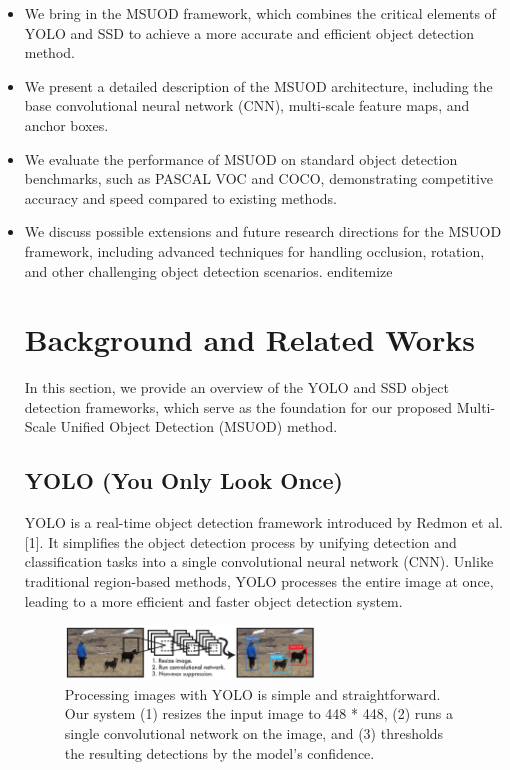 \documentclass[conference]{IEEEtran}
\begin{document}
\begin{itemize}
	
\item We bring in the MSUOD framework, which combines the critical elements of YOLO and SSD to achieve a more accurate and efficient object detection method.
\item We present a detailed description of the MSUOD architecture, including the base convolutional neural network (CNN), multi-scale feature maps, and anchor boxes.
\item We evaluate the performance of MSUOD on standard object detection benchmarks, such as PASCAL VOC and COCO, demonstrating competitive accuracy and speed compared to existing methods.
\item We discuss possible extensions and future research directions for the MSUOD framework, including advanced techniques for handling occlusion, rotation, and other challenging object detection scenarios.
end{itemize}

\section{Background and Related Works}

In this section, we provide an overview of the YOLO and SSD object detection frameworks, which serve as the foundation for our proposed Multi-Scale Unified Object Detection (MSUOD) method.

\subsection{YOLO (You Only Look Once)}

YOLO is a real-time object detection framework introduced by Redmon et al. [1]. It simplifies the object detection process by unifying detection and classification tasks into a single convolutional neural network (CNN)\cite{b1}. Unlike traditional region-based methods, YOLO processes the entire image at once\cite{b2}, leading to a more efficient and faster object detection system.

\begin{figure}
	\includegraphics[width=250]{Yolo1.jpg}
	\caption{Processing images with YOLO is simple and straightforward. Our system (1) resizes the input image to 448 * 448, (2) runs a single convolutional network on the image, and (3) thresholds the resulting detections by the model’s confidence.}
	\label{YOLODetectionSystem}
\end{figure}



\end{itemize}
\end{document}
